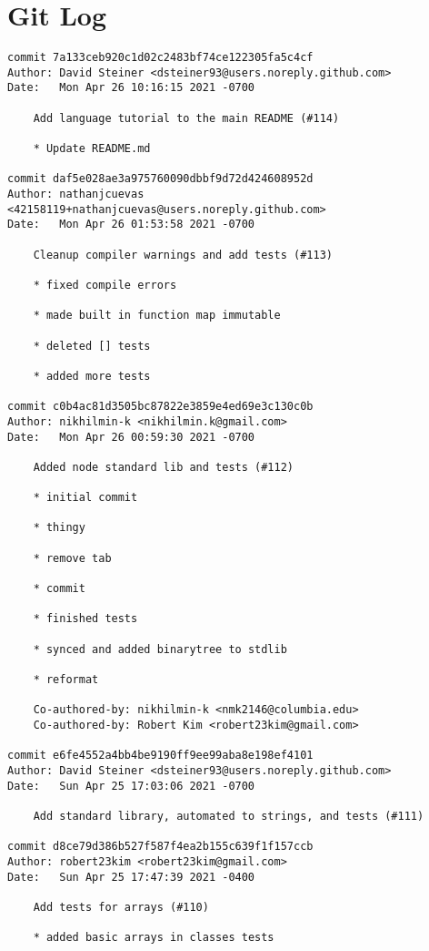\documentclass{article}
\begin{document}
\section{Git Log}
\begin{verbatim}
commit 7a133ceb920c1d02c2483bf74ce122305fa5c4cf
Author: David Steiner <dsteiner93@users.noreply.github.com>
Date:   Mon Apr 26 10:16:15 2021 -0700

    Add language tutorial to the main README (#114)
    
    * Update README.md

commit daf5e028ae3a975760090dbbf9d72d424608952d
Author: nathanjcuevas <42158119+nathanjcuevas@users.noreply.github.com>
Date:   Mon Apr 26 01:53:58 2021 -0700

    Cleanup compiler warnings and add tests (#113)
    
    * fixed compile errors
    
    * made built in function map immutable
    
    * deleted [] tests
    
    * added more tests

commit c0b4ac81d3505bc87822e3859e4ed69e3c130c0b
Author: nikhilmin-k <nikhilmin.k@gmail.com>
Date:   Mon Apr 26 00:59:30 2021 -0700

    Added node standard lib and tests (#112)
    
    * initial commit
    
    * thingy
    
    * remove tab
    
    * commit
    
    * finished tests
    
    * synced and added binarytree to stdlib
    
    * reformat
    
    Co-authored-by: nikhilmin-k <nmk2146@columbia.edu>
    Co-authored-by: Robert Kim <robert23kim@gmail.com>

commit e6fe4552a4bb4be9190ff9ee99aba8e198ef4101
Author: David Steiner <dsteiner93@users.noreply.github.com>
Date:   Sun Apr 25 17:03:06 2021 -0700

    Add standard library, automated to strings, and tests (#111)

commit d8ce79d386b527f587f4ea2b155c639f1f157ccb
Author: robert23kim <robert23kim@gmail.com>
Date:   Sun Apr 25 17:47:39 2021 -0400

    Add tests for arrays (#110)
    
    * added basic arrays in classes tests
    

\end{verbatim}
\end{document}
